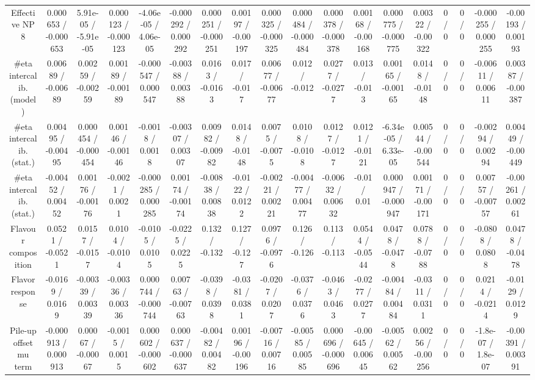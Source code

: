 \documentclass[10pt]{article}
\begin{document}
\begin{table}[htbp]
\begin{center}
\begin{tabular}{|c|c|c|c|c|c|c|c|c|c|c|c|c|c|c|c|c|c|}
  Effective NP 8 & 0.000653 / -0.000653 & 5.91e-05 / -5.91e-05 & 0.000123 / -0.000123 & -4.06e-05 / 4.06e-05 & -0.000292 / 0.000292 & 0.000251 / -0.000251 & 0.00197 / -0.00197 & 0.000325 / -0.000325 & 0.000484 / -0.000484 & 0.000378 / -0.000378 & 0.00168 / -0.00168 & 0.000775 / -0.000775 & 0.00322 / -0.00322 & 0 / 0 & 0 / 0 & -0.000255 / 0.000255 & -0.00193 / 0.00193 \\ 
  #eta intercalib. (model) & 0.00689 / -0.00689 & 0.00259 / -0.00259 & 0.00189 / -0.00189 & -0.000547 / 0.000547 & -0.00388 / 0.00388 & 0.0163 / -0.0163 & 0.017 / -0.017 & 0.00677 / -0.00677 & 0.012 / -0.012 & 0.0277 / -0.0277 & 0.013 / -0.013 & 0.00165 / -0.00165 & 0.0148 / -0.0148 & 0 / 0 & 0 / 0 & -0.00611 / 0.00611 & 0.00387 / -0.00387 \\ 
  #eta intercalib. (stat.) & 0.00495 / -0.00495 & 0.000454 / -0.000454 & 0.00146 / -0.00146 & -0.0018 / 0.0018 & -0.00307 / 0.00307 & 0.00982 / -0.00982 & 0.0148 / -0.0148 & 0.0075 / -0.0075 & 0.0108 / -0.0108 & 0.0127 / -0.0127 & 0.0121 / -0.0121 & -6.34e-05 / 6.33e-05 & 0.00544 / -0.00544 & 0 / 0 & 0 / 0 & -0.00294 / 0.00294 & 0.00449 / -0.00449 \\ 
  #eta intercalib. (stat.) & -0.00452 / 0.00452 & 0.00176 / -0.00176 & -0.0021 / 0.0021 & -0.000285 / 0.000285 & 0.00174 / -0.00174 & -0.00838 / 0.00838 & -0.0122 / 0.0122 & -0.00221 / 0.00221 & -0.00477 / 0.00477 & -0.00632 / 0.00632 & -0.01 / 0.01 & 0.000947 / -0.000947 & 0.00171 / -0.00171 & 0 / 0 & 0 / 0 & 0.00757 / -0.00757 & -0.00261 / 0.00261 \\ 
  Flavour composition & 0.0521 / -0.0521 & 0.0157 / -0.0157 & 0.0104 / -0.0104 & -0.0105 / 0.0105 & -0.0225 / 0.0225 & 0.132 / -0.132 & 0.127 / -0.127 & 0.0976 / -0.0976 & 0.126 / -0.126 & 0.113 / -0.113 & 0.0544 / -0.0544 & 0.0478 / -0.0478 & 0.0788 / -0.0788 & 0 / 0 & 0 / 0 & -0.0808 / 0.0808 & 0.0478 / -0.0478 \\ 
  Flavor response & -0.0169 / 0.0169 & -0.00339 / 0.00339 & -0.00336 / 0.00336 & 0.000744 / -0.000744 & 0.00763 / -0.00763 & -0.0398 / 0.0398 & -0.0381 / 0.0381 & -0.0207 / 0.0207 & -0.0376 / 0.0376 & -0.0463 / 0.0463 & -0.0277 / 0.0277 & -0.00484 / 0.00484 & -0.0311 / 0.0311 & 0 / 0 & 0 / 0 & 0.0214 / -0.0214 & -0.0129 / 0.0129 \\ 
  Pile-up offset mu term & -0.000913 / 0.000913 & 0.00067 / -0.00067 & -0.0015 / 0.0015 & 0.000602 / -0.000602 & 0.000637 / -0.000637 & -0.00482 / 0.00482 & 0.00196 / -0.00196 & -0.00716 / 0.00716 & -0.00585 / 0.00585 & 0.000696 / -0.000696 & -0.00645 / 0.00645 & -0.00562 / 0.00562 & 0.00256 / -0.00256 & 0 / 0 & 0 / 0 & -1.8e-07 / 1.8e-07 & -0.00391 / 0.00391 \\ 

\end{tabular}
\end{center}
\end{table}
\end{document}
